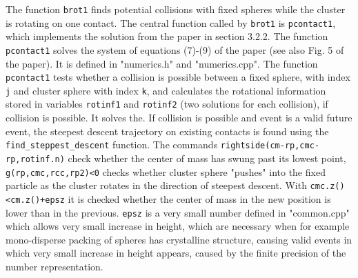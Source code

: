 \documentclass[12pt]{article}
\begin{document}
The function \texttt{brot1} finds potential collisions with fixed spheres while the cluster is rotating on one contact. The central function called by \texttt{brot1} is \texttt{pcontact1}, which implements the solution from the paper in section 3.2.2. The function \texttt{pcontact1} solves the system of equations (7)-(9) of the paper (see also Fig. 5 of the paper). It is defined in "numerics.h" and "numerics.cpp". The function \texttt{pcontact1} tests whether a collision is possible between a fixed sphere, with index \texttt{j} and cluster sphere with index \texttt{k}, and calculates the rotational information stored in variables \texttt{rotinf1} and \texttt{rotinf2} (two solutions for each collision), if collision is possible. It solves the. If collision is possible and event is a valid future event, the steepest descent trajectory on existing contacts is found using the \texttt{find\_steppest\_descent} function. The commands \texttt{rightside(cm-rp,cmc-rp,rotinf.n)} check whether the center of mass has swung past its lowest point, \texttt{g(rp,cmc,rcc,rp2)<0} checks whether cluster sphere "pushes" into the fixed particle as the cluster rotates in the direction of steepest descent. With \texttt{cmc.z()<cm.z()+epsz} it is checked whether the center of mass in the new position is lower than in the previous. \texttt{epsz} is a very small number defined in "common.cpp" which allows very small increase in height, which are necessary when for example mono-disperse packing of spheres has crystalline structure, causing valid events in which very small increase in height appears, caused by the finite precision of the number representation.  
\end{document}
